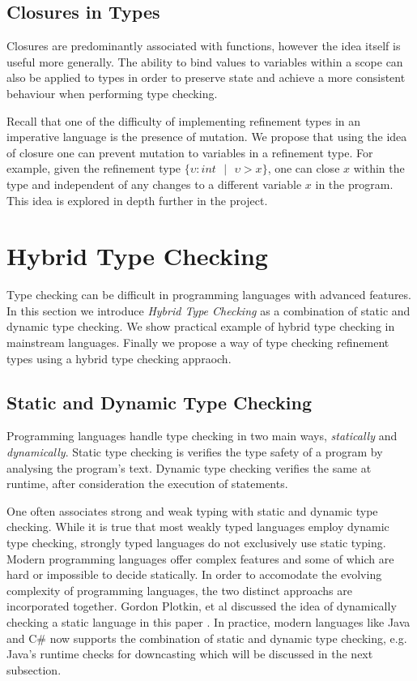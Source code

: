 \documentclass[a4paper,12pt]{report}
\begin{document}
\subsection{Closures in Types}
Closures are predominantly associated with functions, however the idea 
itself is useful more generally. The ability to bind values to variables 
within a scope can also be applied to types in order to preserve state and achieve 
a more consistent behaviour when performing type checking. 

\par
Recall that one of the difficulty of implementing refinement types in an 
imperative language is the presence of mutation. We propose that using the idea  
of closure one can prevent mutation to variables in a refinement type. For 
example, given the refinement type 
$\{\upsilon : int \text{ }|\text{ }\upsilon > x\}$, one can close $x$ within the 
type and independent of any changes to a different variable $x$ in the program. 
This idea is explored in depth further in the project.

\section{Hybrid Type Checking} \label{section:hybrid_type_checking}
Type checking can be difficult in programming languages with advanced features. 
In this section we introduce \emph{Hybrid Type Checking} \cite{hybridTypeChecking} 
as a combination of static and dynamic type checking. We show practical example 
of hybrid type checking in mainstream languages. Finally we propose a way of 
type checking refinement types using a hybrid type checking appraoch.

\subsection{Static and Dynamic Type Checking}
Programming languages handle type checking in two main ways, \textit{statically} 
and \textit{dynamically}. Static type checking is verifies the type 
safety of a program by analysing the program's text. Dynamic type checking 
verifies the same at runtime, after consideration the execution of statements. 

\par
One often associates strong and weak typing with static and dynamic type 
checking. While it is true that most weakly typed languages employ dynamic  
type checking, strongly typed languages do not exclusively use static typing. 
Modern programming languages offer complex features and some of which are hard 
or impossible to decide statically. In order to accomodate the evolving 
complexity of programming languages, the two distinct approachs are 
incorporated together. Gordon Plotkin, et al discussed the 
idea of dynamically checking a static language in this paper 
\cite{dynamicCheckStaticLanguage}. In practice, modern languages like 
Java and C# now supports the combination of static and dynamic type checking, 
e.g. Java's runtime checks for downcasting which will be 
discussed in the next subsection.
\end{document}
